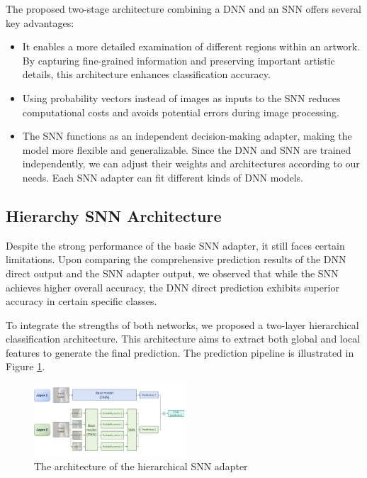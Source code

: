 The proposed two-stage architecture combining a DNN and an SNN offers several key advantages:
\begin{itemize}
    \item It enables a more detailed examination of different regions within an artwork. By capturing fine-grained information and preserving important artistic details, this architecture enhances classification accuracy\cite{imran2023artistic}.
    \item Using probability vectors instead of images as inputs to the SNN reduces computational costs and avoids potential errors during image processing.
    \item The SNN functions as an independent decision-making adapter, making the model more flexible and generalizable. Since the DNN and SNN are trained independently, we can adjust their weights and architectures according to our needs. Each SNN adapter can fit different kinds of DNN models.
\end{itemize}

\subsection{Hierarchy SNN Architecture}
Despite the strong performance of the basic SNN adapter, it still faces certain limitations. Upon comparing the comprehensive prediction results of the DNN direct output and the SNN adapter output, we observed that while the SNN achieves higher overall accuracy, the DNN direct prediction exhibits superior accuracy in certain specific classes. 

To integrate the strengths of both networks, we proposed a two-layer hierarchical classification architecture. This architecture aims to extract both global and local features to generate the final prediction. The prediction pipeline is illustrated in Figure \ref{fig:hierarchical}.
\begin{figure}[h]
    \centering
    \includegraphics[width=0.5\textwidth]{fig/hierarchy.png}
    \caption{The architecture of the hierarchical SNN adapter}
    \label{fig:hierarchical}
\end{figure}

